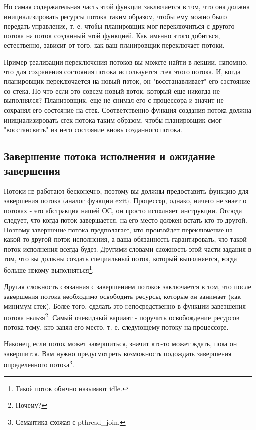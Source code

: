 Но самая содержательная часть этой функции заключается в том, что она должна
инициализировать ресурсы потока таким образом, чтобы ему можно было передать
управление, т. е. чтобы планировщик мог переключиться с другого потока на поток
созданный этой функцией. Как именно этого добиться, естественно, зависит от того,
как ваш планировщик переключает потоки.

Пример реализации переключения потоков вы можете найти в лекции, напомню, что
для сохранения состояния потока используется стек этого потока. И, когда
планировщик переключается на новый поток, он "восстанавливает" его состояние со
стека. Но что если это совсем новый поток, который еще никогда не выполнялся?
Планировщик, еще не снимал его с процессора и значит не сохранял его состояние
на стек. Соответственно функция создания потока должна инициализировать стек
потока таким образом, чтобы планировщик смог "восстановить" из него состояние
вновь созданного потока.

\subsection{Завершение потока исполнения и ожидание завершения}

Потоки не работают бесконечно, поэтому вы должны предоставить функцию для
завершения потока (аналог функции exit). Процессор, однако, ничего не знает
о потоках - это абстракция нашей ОС, он просто исполняет инструкции. Отсюда
следует, что когда поток завершается, на его место должен встать кто-то другой.
Поэтому завершение потока предполагает, что произойдет переключение на какой-то
другой поток исполнения, а ваша обязанность гарантировать, что такой поток
исполнения всегда будет. Другими словами сложность этой части задания в том,
что вы должны создать специальный поток, который выполняется, когда больше
некому выполняться\footnote{Такой поток обычно называют idle.}.

Другая сложность связанная с завершением потоков заключается в том, что после
завершения потока необходимо освободить ресурсы, которые он занимает (как
минимум стек). Более того, сделать это непосредственно в функции завершения
потока нельзя\footnote{Почему?}. Самый очевидный вариант - поручить освобождение
ресурсов потока тому, кто занял его место, т. е. следующему потоку на
процессоре.

Наконец, если поток может завершиться, значит кто-то может ждать, пока он
завершится. Вам нужно предусмотреть возможность подождать завершения
определенного потока\footnote{Семантика схожая с pthread\_join.}.
